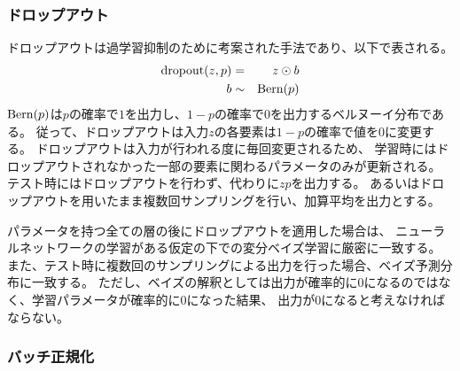 \subsubsection{ドロップアウト}
ドロップアウトは過学習抑制のために考案された手法であり、以下で表される。
\begin{eqnarray}
    {\rm dropout}(z,p) & = & z \odot b \\
    b  & \sim & {\rm Bern}(p)
\end{eqnarray}
\({\rm Bern}(p)\)は\(p\)の確率で\(1\)を出力し、\(1-p\)の確率で\(0\)を出力するベルヌーイ分布である。
従って、ドロップアウトは入力\(z\)の各要素は\(1-p\)の確率で値を\(0\)に変更する。
ドロップアウトは入力が行われる度に毎回変更されるため、
学習時にはドロップアウトされなかった一部の要素に関わるパラメータのみが更新される。
テスト時にはドロップアウトを行わず、代わりに\(zp\)を出力する。
あるいはドロップアウトを用いたまま複数回サンプリングを行い、加算平均を出力とする。

パラメータを持つ全ての層の後にドロップアウトを適用した場合は、
ニューラルネットワークの学習がある仮定の下での変分ベイズ学習に厳密に一致する。
また、テスト時に複数回のサンプリングによる出力を行った場合、ベイズ予測分布に一致する\cite{ベイズドロップアウト}。
ただし、ベイズの解釈としては出力が確率的に\(0\)になるのではなく、学習パラメータが確率的に\(0\)になった結果、
出力が\(0\)になると考えなければならない。

\subsubsection{バッチ正規化}